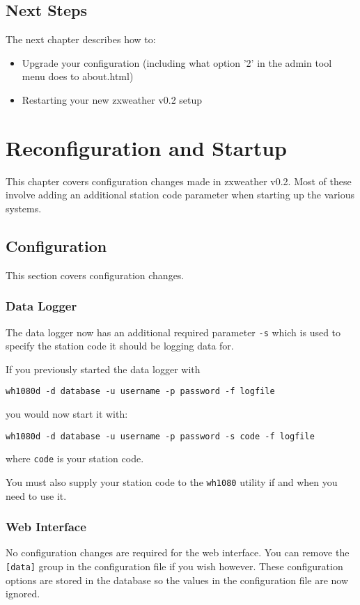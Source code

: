 \documentclass[a4paper,10pt,draft]{book}
\begin{document}
\section{Next Steps}
The next chapter describes how to:
\begin{itemize}
\item Upgrade your configuration (including what option '2' in the admin tool menu does to about.html)
\item Restarting your new zxweather v0.2 setup
\end{itemize}

\chapter{Reconfiguration and Startup}
This chapter covers configuration changes made in zxweather v0.2. Most of these involve adding an additional station code parameter when starting up the various systems.

\section{Configuration}
This section covers configuration changes.

\subsection{Data Logger}
The data logger now has an additional required parameter \verb|-s| which is used to specify the station code it should be logging data for.

If you previously started the data logger with
\begin{verbatim}
wh1080d -d database -u username -p password -f logfile
\end{verbatim}

you would now start it with:
\begin{verbatim}
wh1080d -d database -u username -p password -s code -f logfile
\end{verbatim}
where \verb|code| is your station code.

You must also supply your station code to the \verb|wh1080| utility if and when you need to use it.

\subsection{Web Interface}
No configuration changes are required for the web interface. You can remove the \verb|[data]| group in the configuration file if you wish however. These configuration options are stored in the database so the values in the configuration file are now ignored.
\end{document}

